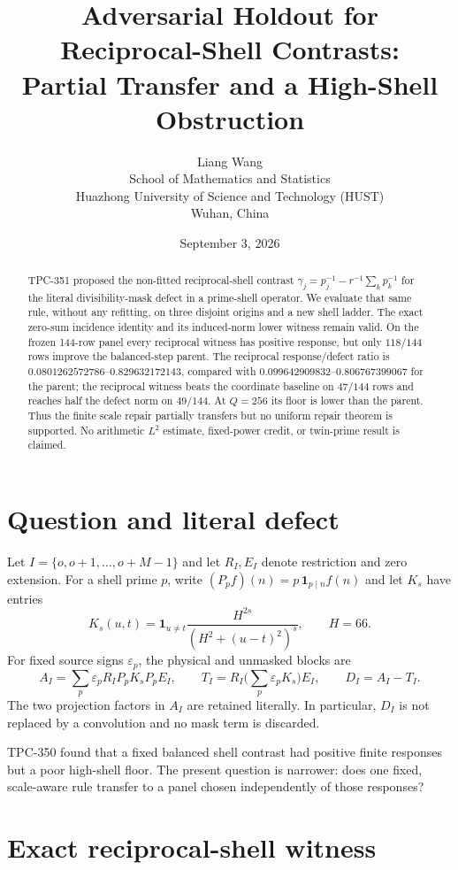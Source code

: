 \documentclass[10pt]{article}
\title{Adversarial Holdout for Reciprocal-Shell Contrasts:\\
Partial Transfer and a High-Shell Obstruction}
\author{Liang Wang\\
School of Mathematics and Statistics\\
Huazhong University of Science and Technology (HUST)\\
Wuhan, China}
\date{September 3, 2026}
\newcommand{\ind}[1]{\mathbf{1}_{#1}}
\begin{document}
\maketitle

\begin{abstract}
TPC-351 proposed the non-fitted reciprocal-shell contrast
$\gamma_j=p_j^{-1}-r^{-1}\sum_k p_k^{-1}$ for the literal divisibility-mask
defect in a prime-shell operator.  We evaluate that same rule, without any
refitting, on three disjoint origins and a new shell ladder.  The exact
zero-sum incidence identity and its induced-norm lower witness remain valid.
On the frozen 144-row panel every reciprocal witness has positive response,
but only $118/144$ rows improve the balanced-step parent.  The reciprocal
response/defect ratio is $0.0801262572786$--$0.829632172143$, compared with
$0.099642909832$--$0.806767399067$ for the parent; the reciprocal witness
beats the coordinate baseline on $47/144$ rows and reaches half the defect
norm on $49/144$.  At $Q=256$ its floor is lower than the parent.  Thus the
finite scale repair partially transfers but no uniform repair theorem is
supported.  No arithmetic $L^2$ estimate, fixed-power credit, or twin-prime
result is claimed.
\end{abstract}

\section{Question and literal defect}

Let $I=\{o,o+1,\ldots,o+M-1\}$ and let $R_I,E_I$ denote restriction and
zero extension.  For a shell prime $p$, write
$(P_pf)(n)=p\,\ind{p\mid n}f(n)$ and let $K_s$ have entries
\[
 K_s(u,t)=\ind{u\ne t}\frac{H^{2s}}{(H^2+(u-t)^2)^s},\qquad H=66.
\]
For fixed source signs $\varepsilon_p$, the physical and unmasked blocks are
\[
 A_I=\sum_p\varepsilon_pR_IP_pK_sP_pE_I,
 \qquad T_I=R_I\Big(\sum_p\varepsilon_pK_s\Big)E_I,
 \qquad D_I=A_I-T_I.
\]
The two projection factors in $A_I$ are retained literally.  In particular,
$D_I$ is not replaced by a convolution and no mask term is discarded.

TPC-350 found that a fixed balanced shell contrast had positive finite
responses but a poor high-shell floor.  The present question is narrower:
does one fixed, scale-aware rule transfer to a panel chosen independently of
those responses?

\section{Exact reciprocal-shell witness}
\end{document}
